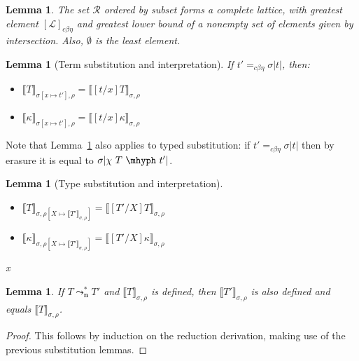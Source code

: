 \documentclass{article}
\newcommand{\interp}[1]{\llbracket #1 \rrbracket}
\newcommand{\leadstocs}[0]{\ensuremath{\leadsto_{\mathbf{n}}^*}}
\newcommand{\cbe}[0]{c\beta\eta}
\newtheorem{lemma}[theorem]{Lemma}
\begin{document}
\begin{lemma}
  The set $\mathcal{R}$ ordered by subset forms a complete lattice,
  with greatest element $[\mathcal{L}]_{\cbe}$ and greatest lower bound
  of a nonempty set of elements given by
  intersection.  Also, $\emptyset$ is the least element.
\end{lemma}

\begin{lemma}[Term substitution and interpretation]
\label{lem:termsubstinterp}
If $t' =_{\cbe} \sigma |t|$, then: 
\begin{itemize}
\item $\interp{T}_{\sigma[x\mapsto t'],\rho} = \interp{[t/x]T}_{\sigma,\rho}$
\item $\interp{\kappa}_{\sigma[x\mapsto t'],\rho} = \interp{[t/x]\kappa}_{\sigma,\rho}$
\end{itemize}
\end{lemma}

Note that Lemma~\ref{lem:termsubstinterp} also applies to typed substitution: if
\(t' =_{\cbe} \sigma|t|\) then by erasure it is equal to \(\sigma|\chi\ T\
\mhyph\ t'|\).

\begin{lemma}[Type substitution and interpretation] 
  \label{lem:tpsubstinterp}
  \ \\
  \begin{itemize}
  \item $\interp{T}_{\sigma,\rho[X\mapsto\interp{T'}_{\sigma,\rho}]} = \interp{[T'/X]T}_{\sigma,\rho}$
  \item $\interp{\kappa}_{\sigma,\rho[X\mapsto\interp{T'}_{\sigma,\rho}]} = \interp{[T'/X]\kappa}_{\sigma,\rho}$
  \end{itemize}
x\end{lemma}

\begin{lemma}
  \label{lem:interppres}
  If $T \leadstocs T'$ and $\interp{T}_{\sigma,\rho}$ is defined, then $\interp{T'}_{\sigma,\rho}$ is also defined and equals $\interp{T}_{\sigma,\rho}$.
\end{lemma}
\begin{proof}
  This follows by induction on the reduction derivation, making use of the previous substitution lemmas.
\end{proof}
\end{document}
